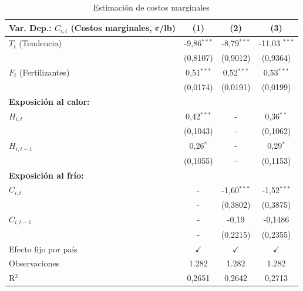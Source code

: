 \scriptsize
\begin{table}[H]
\caption{Estimación de costos marginales}
\label{tab:est_cost}
\centering
\begin{tabular}{lccc}
\hline 
\hline 
Var. Dep.: $C_{i, t}$ (Costos marginales, ¢/lb) & (1) & (2) & (3)\\   
\hline 

$T_{t}$ (Tendencia)                   & -9,86$^{***}$ & -8,79$^{***}$ & -11,03 $^{***}$ \\   
                            & (0,8107) & (0,9012) & (0,9364) \\   
$F_{t}$ (Fertilizantes)               & 0,51$^{***}$ & 0,52$^{***}$ & 0,53$^{***}$ \\   
                            & (0,0174) & (0,0191) & (0,0199)\\ 
\textbf{Exposición al calor:} \\
$H_{i, t}$                  & 0,42$^{***}$ & - & 0,36$^{**}$ \\   
                            & (0,1043) & - & (0,1062) \\   
$H_{i, t-1}$                & 0,26$^{*}$ & - & 0,29$^{*}$ \\   
                            & (0,1055) & - & (0,1153)\\ 
\textbf{Exposición al frío:} \\
$C_{i, t}$                  & - & -1,60$^{***}$ & -1,52$^{***}$ \\   
                            & - & (0,3802) & (0,3875)\\   
$C_{i, t-1}$      & - & -0,19 & -0,1486\\   
                            & - & (0,2215) & (0,2355)\\  
\hline
Efecto fijo por país        & $\checkmark$ & $\checkmark$ & $\checkmark$ \\  
\hline
Observaciones               & 1.282 & 1.282 & 1.282\\  
R$^2$                       & 0,2651 & 0,2642 & 0,2713\\     
\hline
\hline
\end{tabular}
\end{table}